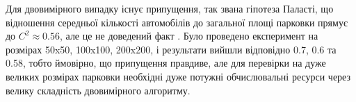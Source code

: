 Для двовимірного випадку існує припущення, так звана гіпотеза Паласті, що відношення середньої кількості автомобілів до загальної площі парковки прямує до $C^2 \approx 0.56$, але це не доведений факт \cite{MathWorldRenyi}. Було проведено експеримент на розмірах 50x50, 100x100, 200x200, і результати вийшли відповідно 0.7, 0.6 та 0.58, тобто ймовірно, що припущення правдиве, але для перевірки на дуже великих розмірах парковки необхідні дуже потужні обчислювальні ресурси через велику складність двовимірного алгоритму.
